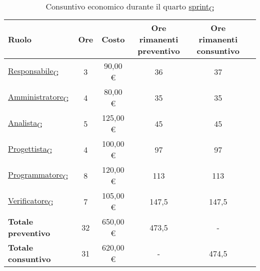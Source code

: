 \begin{table}[!h]
	\centering
	\begin{tabular}{ | l | c | c | c | c | c | }
		\hline
		\textbf{Ruolo}             & \textbf{Ore} & \textbf{Costo} & \textbf{Ore rimanenti preventivo} & \textbf{Ore rimanenti consuntivo} \\
		\hline
		\href{https://7last.github.io/docs/rtb/documentazione-interna/glossario\#responsabile}{Responsabile\textsubscript{G}}               & 3            & 90,00 €        & 36                                & 37                                \\
		\href{https://7last.github.io/docs/rtb/documentazione-interna/glossario\#amministratore}{Amministratore\textsubscript{G}}             & 4            & 80,00 €        & 35                                & 35                                \\
		\href{https://7last.github.io/docs/rtb/documentazione-interna/glossario\#analista}{Analista\textsubscript{G}}                   & 5            & 125,00 €       & 45                                & 45                                \\
		\href{https://7last.github.io/docs/rtb/documentazione-interna/glossario\#progettista}{Progettista\textsubscript{G}}                & 4            & 100,00 €       & 97                                & 97                                \\
		\href{https://7last.github.io/docs/rtb/documentazione-interna/glossario\#programmatore}{Programmatore\textsubscript{G}}              & 8            & 120,00 €       & 113                               & 113                               \\
		\href{https://7last.github.io/docs/rtb/documentazione-interna/glossario\#verificatore}{Verificatore\textsubscript{G}}               & 7            & 105,00 €       & 147,5                             & 147,5                             \\
		\hline
		\textbf{Totale preventivo} & 32           & 650,00 €       & 473,5                             & -                                 \\
		\hline
		\textbf{Totale consuntivo} & 31           & 620,00 €       & -                                 & 474,5                             \\
		\hline
	\end{tabular}
	\caption{Consuntivo economico durante il quarto \href{https://7last.github.io/docs/rtb/documentazione-interna/glossario\#sprint}{sprint\textsubscript{G}}}
	
\end{table}

